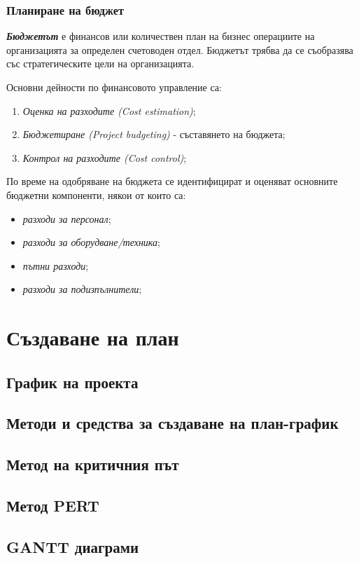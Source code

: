 \documentclass[fleqn,12pt]{article}
\begin{document}
\subsubsection{Планиране на бюджет}

\textbf{\textit{Бюджетът}} е финансов или количествен план на бизнес операциите на организацията за определен счетоводен отдел.
Бюджетът трябва да се съобразява със стратегическите цели на организацията.

Основни дейности по финансовото управление са:
\begin{enumerate}
    \item \textit{Оценка на разходите (Cost estimation)};
    \item \textit{Бюджетиране (Project budgeting)} - съставянето на бюджета;
    \item \textit{Контрол на разходите (Cost control)};
\end{enumerate}

По време на одобряване на бюджета се идентифицират и оценяват основните бюджетни компоненти, някои от които са:
\begin{itemize}
    \item \textit{разходи за персонал};
    \item \textit{разходи за оборудване/техника};
    \item \textit{пътни разходи};
    \item \textit{разходи за подизпълнители};
\end{itemize}

\section{Създаване на план}

\subsection{График на проекта}
\subsection{Методи и средства за създаване на план-график}
\subsection{Метод на критичния път}
\subsection{Метод PERT}
\subsection{GANTT диаграми}
\end{document}
